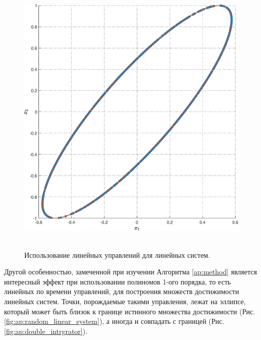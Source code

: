 \documentclass[../main.tex]{subfiles}
\begin{document}
\begin{figure}[ht!]
\begin{minipage}[b]{.4\linewidth}
  		\includegraphics[width=\linewidth]{images/double_integrator_linear_control.eps}
  		 \label{fig:ap:double_intrgrator} 
  	\end{minipage} 
  	\caption{Использование линейных управлений для линейных систем.}\label{fig:ap:linear_control}
  \end{figure}
  
  Другой особенностью, замеченной при изучении Алгоритма \ref{ap:method} является интересный эффект при использовании полиномов 1-ого порядка, то есть линейных по времени управлений, для построения множеств достижимости линейных систем.
  Точки, порождаемые такими управления, лежат на эллипсе, который может быть близок к границе истинного множества достижимости (Рис.  \ref{fig:ap:random_linear_system}), а иногда и совпадать с границей (Рис. \ref{fig:ap:double_intrgrator}). 
  
\end{document}
